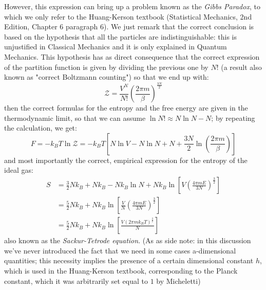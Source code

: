 However, this expression can bring up a problem known as the \textit{Gibbs Paradox}, to which we only refer to the Huang-Kerson textbook (Statistical Mechanics, 2nd Edition, Chapter 6 paragraph 6). We just remark that the correct conclusion is based on the hypothesis that all the particles are indistinguishable: this is unjustified in Classical Mechanics and it is only explained in Quantum Mechanics. This hypothesis has as direct consequence that the correct expression of the partition function is given by dividing the previous one by $N!$ (a result also known as "correct Boltzmann counting") so that we end up with:
\begin{equation}
    \mathcal{Z}=\frac{V^N}{N!} \left(\frac{2\pi m}{\beta} \right)^{\frac{3N}{2}} \label{eq:zcannone}
\end{equation}
then the correct formulas for the entropy and the free energy are given in the thermodynamic limit, so that we can assume $\ln{N!}\approx N\ln{N}-N$; by repeating the calculation, we get:
\begin{equation}
    F=-k_B T \ln{\mathcal{Z}}=-k_B T \left[N\ln{V}-N\ln{N}+N+\frac{3N}{2}\ln{\left(\frac{2\pi m}{\beta} \right)}\right]
\end{equation}
and most importantly the correct, empirical expression for the entropy of the ideal gas:
\begin{equation}
\begin{split}
    S & =\frac{3}{2}N k_B + N k_B - N k_B\ln{N}+ N k_B \ln{\left[V\left(\frac{4\pi m E}{3N} \right)^{\frac{3}{2}} \right]} \\
    & =\frac{5}{2}N k_B+N k_B \ln{\left[\frac{V}{N}\left(\frac{4\pi m E}{3N} \right)^{\frac{3}{2}} \right]} \\
    & =\frac{5}{2}N k_B+N k_B \ln{\left[\frac{V(2\pi m k_B T)^{\frac{3}{2}}}{N} \right]}
\end{split}
\end{equation}
also known as the \textit{Sackur-Tetrode equation}. (As as side note: in this discussion we've never introduced the fact that we need in some cases a-dimensional quantities; this necessity implies the presence of a certain dimensional constant $h$, which is used in the Huang-Kerson textbook, corresponding to the Planck constant, which it was arbitrarily set equal to $1$ by Micheletti)
